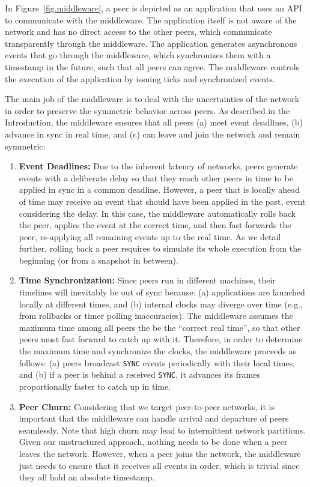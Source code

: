 \documentclass[10pt,journal,compsoc]{IEEEtran}
\newcommand{\code}[1]  {\texttt{\footnotesize{#1}}}
\begin{document}
In Figure~\ref{fig.middleware}, a peer is depicted as an application that uses
an API to communicate with the middleware.
The application itself is not aware of the network and has no direct access to
the other peers, which communicate transparently through the middleware.
The application generates asynchronous events that go through the middleware,
which synchronizes them with a timestamp in the future, such that all peers can
agree.
The middleware controls the execution of the application by issuing ticks and
synchronized events.

The main job of the middleware is to deal with the uncertainties of the
network in order to preserve the symmetric behavior across peers.
As described in the Introduction, the middleware ensures that all peers
    (a) meet event deadlines,
    (b) advance in sync in real time, and
    (c) can leave and join the network and remain symmetric:
%
\begin{enumerate}
\item \textbf{Event Deadlines:}
Due to the inherent latency of networks, peers generate events with a
deliberate delay so that they reach other peers in time to be applied in sync
in a common deadline.
However, a peer that is locally ahead of time may receive an event that should
have been applied in the past, event considering the delay.
In this case, the middleware automatically rolls back the peer, applies the
event at the correct time, and then fast forwards the peer, re-applying all
remaining events up to the real time.
As we detail further, rolling back a peer requires to simulate its whole
execution from the beginning (or from a snapshot in between).
%
\item \textbf{Time Synchronization:}
Since peers run in different machines, their timelines will inevitably be out
of sync because:
    (a) applications are launched locally at different times, and
    (b) internal clocks may diverge over time (e.g., from rollbacks or timer
        polling inaccuracies).
The middleware assumes the maximum time among all peers the be the
``correct real time'', so that other peers must fast forward to catch up with
it.
Therefore, in order to determine the maximum time and synchronize the clocks,
the middleware proceeds as follows:
    (a) peers broadcast \code{SYNC} events periodically with their local
        times, and
    (b) if a peer is behind a received \code{SYNC}, it advances its frames
        proportionally faster to catch up in time.
%
\item \textbf{Peer Churn:}
Considering that we target peer-to-peer networks, it is important that the
middleware can handle arrival and departure of peers seamlessly.
Note that high churn may lead to intermittent network partitions.
Given our unstructured approach, nothing needs to be done when a peer leaves
the network.
However, when a peer joins the network, the middleware just needs to ensure
that it receives all events in order, which is trivial since they all hold an
absolute timestamp.
\end{enumerate}
\end{document}
